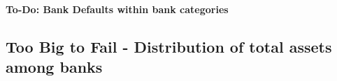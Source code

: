\documentclass[12pt, a4paper]{article} %
\begin{document}
\textbf{To-Do: Bank Defaults within bank categories}

\fi

\newpage

\subsection{Too Big to Fail - Distribution of total assets among banks}
\label{sec:ToBigToFail}
\end{document}
